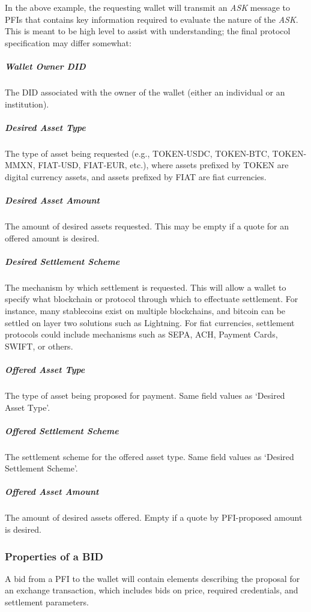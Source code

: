 \documentclass[11pt]{article}
\begin{document}
In the above example, the requesting wallet will transmit an \textit{ASK }message to PFIs that contains key information required to evaluate the nature of the \textit{ASK}. This is meant to be high level to assist with understanding; the final protocol specification may differ somewhat: \ \ 

\subparagraph{Wallet Owner DID}

The DID associated with the owner of the wallet (either an individual or an institution).

\subparagraph{Desired Asset Type}

The type of asset being requested (e.g., TOKEN-USDC, TOKEN-BTC, TOKEN-MMXN, FIAT-USD, FIAT-EUR, etc.), where assets prefixed by TOKEN are digital currency assets, and assets prefixed by FIAT are fiat currencies.\textit{ }

\subparagraph{Desired Asset Amount}

The amount of desired assets requested. This may be empty if a quote for an offered amount is desired. 

\subparagraph{Desired Settlement Scheme}

The mechanism by which settlement is requested. This will allow a wallet to specify what blockchain or protocol through which to effectuate settlement. For instance, many stablecoins exist on multiple blockchains, and bitcoin can be settled on layer two solutions such as Lightning. For fiat currencies, settlement protocols could include mechanisms such as SEPA, ACH, Payment Cards, SWIFT, or others.

\subparagraph{Offered Asset Type}

The type of asset being proposed for payment. Same field values as ‘Desired Asset Type’.

\subparagraph{Offered Settlement Scheme}

The settlement scheme for the offered asset type. Same field values as ‘Desired Settlement Scheme’.

\subparagraph{Offered Asset Amount}

The amount of desired assets offered. Empty if a quote by PFI-proposed amount is desired. 

\vspace{1\baselineskip}
\subsubsection{Properties of a BID}

A bid from a PFI to the wallet will contain elements describing the proposal for an exchange transaction, which includes bids on price, required credentials, and settlement parameters. 
\end{document}
